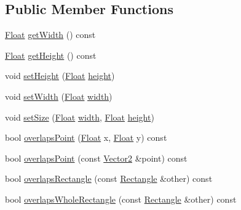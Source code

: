 \subsection*{Public Member Functions}
\begin{DoxyCompactItemize}
\item 
\hyperlink{namespaceZeta_a1e0a1265f9b3bd3075fb0fabd39088ba}{Float} \hyperlink{classZeta_1_1Rectangle_a45c5fe8a824e41de4c5f9268e34c298c}{get\+Width} () const 
\item 
\hyperlink{namespaceZeta_a1e0a1265f9b3bd3075fb0fabd39088ba}{Float} \hyperlink{classZeta_1_1Rectangle_abe3bf5a637e5fb73078e3c3a28a04699}{get\+Height} () const 
\item 
void \hyperlink{classZeta_1_1Rectangle_ae93bd8646b6bd28b1fcc6a2ce6fe3a84}{set\+Height} (\hyperlink{namespaceZeta_a1e0a1265f9b3bd3075fb0fabd39088ba}{Float} \hyperlink{classZeta_1_1Rectangle_a640f13febc3856b9c4a0729a3aeec1a8}{height})
\item 
void \hyperlink{classZeta_1_1Rectangle_af602ae20ae9d10466a5d6c4028ff180d}{set\+Width} (\hyperlink{namespaceZeta_a1e0a1265f9b3bd3075fb0fabd39088ba}{Float} \hyperlink{classZeta_1_1Rectangle_a1d564c934b684c156de3fe425ac42e74}{width})
\item 
void \hyperlink{classZeta_1_1Rectangle_a60f5840446193641ebceb4440c97bcc5}{set\+Size} (\hyperlink{namespaceZeta_a1e0a1265f9b3bd3075fb0fabd39088ba}{Float} \hyperlink{classZeta_1_1Rectangle_a1d564c934b684c156de3fe425ac42e74}{width}, \hyperlink{namespaceZeta_a1e0a1265f9b3bd3075fb0fabd39088ba}{Float} \hyperlink{classZeta_1_1Rectangle_a640f13febc3856b9c4a0729a3aeec1a8}{height})
\item 
bool \hyperlink{classZeta_1_1Rectangle_a35e931b62b3b071ec1ce821ab0e84dbb}{overlaps\+Point} (\hyperlink{namespaceZeta_a1e0a1265f9b3bd3075fb0fabd39088ba}{Float} x, \hyperlink{namespaceZeta_a1e0a1265f9b3bd3075fb0fabd39088ba}{Float} y) const 
\item 
bool \hyperlink{classZeta_1_1Rectangle_afbc6bf03a13a7958532740cf9ff53131}{overlaps\+Point} (const \hyperlink{classZeta_1_1Vector2}{Vector2} \&point) const 
\item 
bool \hyperlink{classZeta_1_1Rectangle_af705894435b5bc4dacf3bc5a108f47af}{overlaps\+Rectangle} (const \hyperlink{classZeta_1_1Rectangle}{Rectangle} \&other) const 
\item 
bool \hyperlink{classZeta_1_1Rectangle_ad30eac6fe579eb693e169009be2a02d8}{overlaps\+Whole\+Rectangle} (const \hyperlink{classZeta_1_1Rectangle}{Rectangle} \&other) const 
\item 

\end{DoxyCompactItemize}
